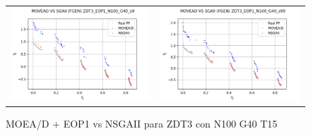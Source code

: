 \begin{figure}[H]
\begin{tabular}{c c}
    \includegraphics[scale=0.5]{figures/ZDT3_EOP1_N100_G40_T15/s9_comp.png} &
    \includegraphics[scale=0.5]{figures/ZDT3_EOP1_N100_G40_T15/s99_comp.png}\\
    \end{tabular}
    \caption{\centering MOEA/D + EOP1 vs NSGAII para ZDT3 con N100 G40 T15}
    \label{fig:11}
\end{figure}



